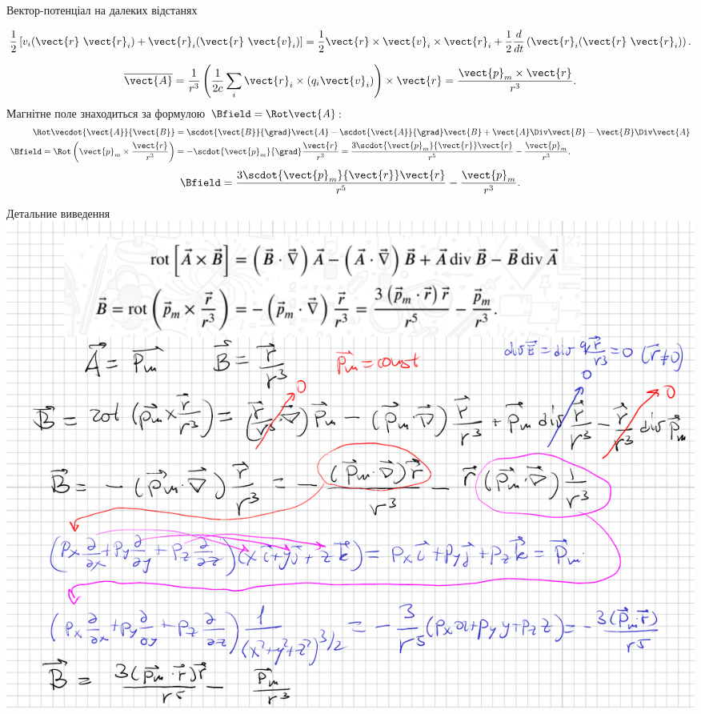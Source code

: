\documentclass{beamer}
\begin{document}
\begin{frame}{Вектор-потенціал на далеких відстанях}{}
\begin{overprint}
\begin{center}
\begin{equation*}
				\frac12\left[v_i(\vect{r}\
					\vect{r}_i) + \vect{r}_i(\vect{r}\ \vect{v}_i)\right]
				= \frac12 \vect{r}\times\vect{v}_i\times\vect{r}_i + \frac12\frac{d}{dt}\left(\vect{r}_i(\vect{r}\ \vect{r}_i)\right).
			\end{equation*}
		\end{center}
		\begin{equation*}
			\overline{\vect{A}} =  \frac1{r^3}  \left(\frac1{2c} \sum_i \vect{r}_i\times (q_i\vect{v}_i)\right)\times\vect{r} =
			\frac{\vect{p}_m\times\vect{r}}{r^3} .
		\end{equation*}
		Магнітне поле знаходиться за формулою $\Bfield = \Rot\vect{A}$:
		{\scriptsize%
		\begin{align*}
			\Rot\vecdot{\vect{A}}{\vect{B}}                                 & = \scdot{\vect{B}}{\grad}\vect{A} - \scdot{\vect{A}}{\grad}\vect{B}
			+ 	\vect{A}\Div\vect{B} -
			\vect{B}\Div\vect{A}
			\\
			\Bfield = \Rot\left(\vect{p}_m\times\frac{\vect{r}}{r^3}\right) &
			=
			-\scdot{\vect{p}_m}{\grad}\frac{\vect{r}}{r^3} = \frac{3\scdot{\vect{p}_m}{\vect{r}}\vect{r}}{r^5} - \frac{\vect{p}_m}{r^3}.
		\end{align*}
		}
		\begin{equation*}
			\Bfield = \frac{3\scdot{\vect{p}_m}{\vect{r}}\vect{r}}{r^5} - \frac{\vect{p}_m}{r^3}.
		\end{equation*}
	\end{overprint}
\end{frame}


\begin{frame}{Детальние виведення}{}
	\thispagestyle{empty}
	\includegraphics[width=\linewidth]{BrotA}
\end{frame}
\end{document}

